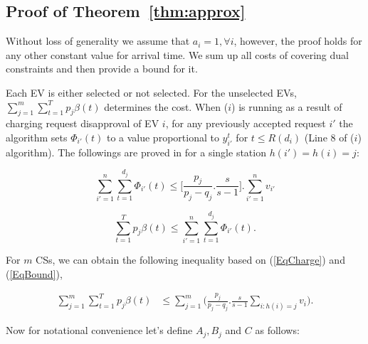 			
	

		
\subsection{Proof of Theorem~\ref{thm:approx}}
			\label{app:1}
			Without loss of generality we assume that $a_i=1, \forall i$, however, the proof holds for any other constant value for arrival time. We sum up all costs of covering dual constraints and then provide a bound for it. 
			
			Each EV is either selected or not selected. For the unselected EVs, $\sum_{j=1}^m \sum_{t=1}^T p_j\beta (t)$ determines the cost. When \bc($i$) is running as a result of charging request disapproval of EV $i$, for any previously accepted request $i'$ the algorithm sets $\Phi_{i'}(t)$ to a value proportional to $y_{i'}^t$ for $t\leq R(d_i)$ (Line 8 of \bc($i$) algorithm). The followings are proved in \cite{Jain} for a single station $h(i')=h(i)=j$:
			
			\begin{equation}
				\sum_{i'=1}^n \sum_{t=1}^{d_{j}} \Phi_{i'}(t) \leq \bigg[ \frac{p_j}{p_j-q_j}.\frac{s}{s-1} \bigg].\sum_{i'=1}^n v_{i'}
				\label{EqCharge}
			\end{equation} 
			
			\begin{equation}
				\sum_{t=1}^T p_j\beta (t)\leq \sum_{i'=1}^n \sum_{t=1}^{d_{j}} \Phi_{i'}(t).
				\label{EqBound}
			\end{equation}
			
			
			For $m$ CSs, we can obtain the following inequality based on (\ref{EqCharge}) and (\ref{EqBound}),
			
			\begin{align}
				\sum_{j=1}^m \sum_{t=1}^T p_j\beta (t)&\leq \sum_{j=1}^m \Big( \frac{p_j}{p_j-q_j}.\frac{s}{s-1}\sum_{i: h(i)=j}v_{i}\Big)\label{EqMS}.
			\end{align}
			
			Now for notational convenience let's define $A_j, B_j$ and $C$ as follows:
			
